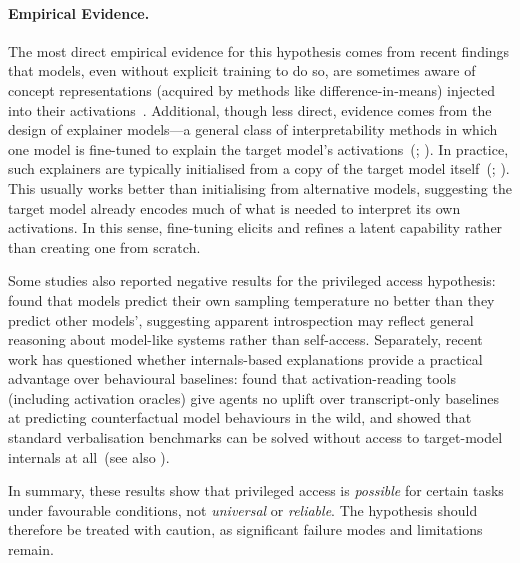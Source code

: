 \paragraph{Empirical Evidence.}



The most direct empirical evidence for this hypothesis comes from recent findings that models, even without explicit training to do so, are sometimes aware of concept representations (acquired by methods like difference-in-means) injected into their activations~. Additional, though less direct, evidence comes from the design of explainer models---a general class of interpretability methods in which one model is fine-tuned to explain the target model’s activations~(; ). In practice, such explainers are typically initialised from a copy of the target model itself~(; ). This usually works better than initialising from alternative models, suggesting the target model already encodes much of what is needed to interpret its own activations. In this sense, fine-tuning elicits and refines a latent capability rather than creating one from scratch.


Some studies also reported negative results for the privileged access hypothesis:  found that models predict their own sampling temperature no better than they predict other models', suggesting apparent introspection may reflect general reasoning about model-like systems rather than self-access. Separately, recent work has questioned whether internals-based explanations provide a practical advantage over behavioural baselines:  found that activation-reading tools (including activation oracles) give agents no uplift over transcript-only baselines at predicting counterfactual model behaviours in the wild, and  showed that standard verbalisation benchmarks can be solved without access to target-model internals at all~(see also ).

In summary, these results show that privileged access is \textit{possible} for certain tasks under favourable conditions, not \textit{universal} or \textit{reliable}. The hypothesis should therefore be treated with caution, as significant failure modes and limitations remain.





